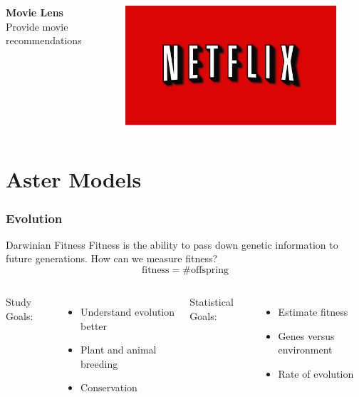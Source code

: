 \documentclass[table]{beamer}
\begin{document}
\begin{frame}
\begin{columns}[t]
  \textbf{Movie Lens}\\
  Provide movie recommendations
\begin{figure}
\includegraphics[width=0.8\linewidth]{netflix.png}
\end{figure}
\end{columns}
\end{frame}


\section{Aster Models}

\begin{frame}
  \frametitle{Evolution}
\begin{block}{Darwinian Fitness}
  Fitness is the ability to pass down genetic information to future
  generations. How can we measure fitness? 
  $$ \text{fitness} = \# \text{offspring}$$
\end{block}
\begin{columns}[t]
Study Goals:
  \begin{itemize}
    \item Understand evolution better
    \item Plant and animal breeding
    \item Conservation
  \end{itemize}

Statistical Goals:
  \begin{itemize}
    \item Estimate fitness
    \item Genes versus environment
    \item Rate of evolution
  \end{itemize}
\end{columns}
\end{frame}
\end{document}
